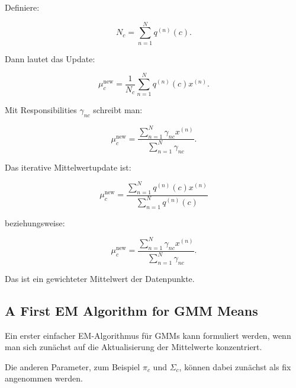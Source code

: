 \documentclass[11pt,a4paper]{scrartcl}
\begin{document}
\begin{calculationbox}
    Definiere:

    \[
        N_c
        =
        \sum_{n=1}^{N}
        q^{(n)}(c).
    \]

    Dann lautet das Update:

    \[
        \mu_c^{\mathrm{new}}
        =
        \frac{1}{N_c}
        \sum_{n=1}^{N}
        q^{(n)}(c)x^{(n)}.
    \]

    Mit Responsibilities \(\gamma_{nc}\) schreibt man:

    \[
        \mu_c^{\mathrm{new}}
        =
        \frac{
            \sum_{n=1}^{N}
            \gamma_{nc}x^{(n)}
        }{
            \sum_{n=1}^{N}
            \gamma_{nc}
        }.
    \]
\end{calculationbox}

\begin{answerbox}
    Das iterative Mittelwertupdate ist:

    \[
        \boxed{
            \mu_c^{\mathrm{new}}
            =
            \frac{
                \sum_{n=1}^{N}
                q^{(n)}(c)x^{(n)}
            }{
                \sum_{n=1}^{N}
                q^{(n)}(c)
            }
        }
    \]

    beziehungsweise:

    \[
        \boxed{
            \mu_c^{\mathrm{new}}
            =
            \frac{
                \sum_{n=1}^{N}
                \gamma_{nc}x^{(n)}
            }{
                \sum_{n=1}^{N}
                \gamma_{nc}
            }.
        }
    \]

    Das ist ein gewichteter Mittelwert der Datenpunkte.
\end{answerbox}

\subsection{A First EM Algorithm for GMM Means}

\begin{notebox}
    Ein erster einfacher EM-Algorithmus für GMMs kann formuliert werden, wenn
    man sich zunächst auf die Aktualisierung der Mittelwerte konzentriert.

    Die anderen Parameter, zum Beispiel \(\pi_c\) und \(\Sigma_c\), können dabei
    zunächst als fix angenommen werden.
\end{notebox}
\end{document}
